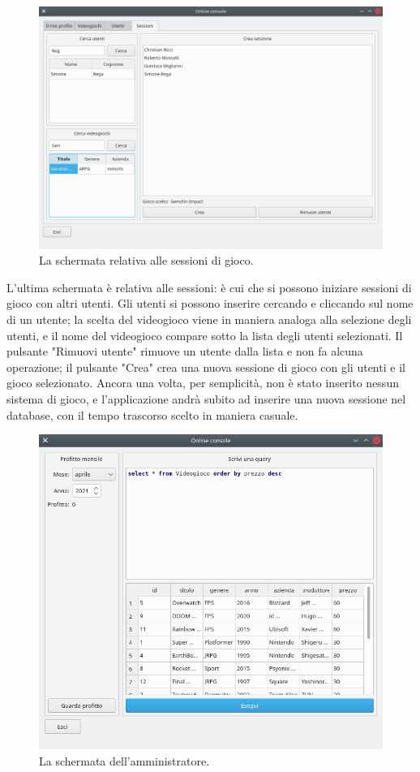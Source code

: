 \documentclass[a4paper,12pt]{report}
\begin{document}
\begin{figure}[H]
\centering{}
\includegraphics[width=12cm]{screen_sessions.png}
\caption{La schermata relativa alle sessioni di gioco.}
\label{img:screen_login}
\end{figure}

L'ultima schermata è relativa alle sessioni: è cui che si possono iniziare sessioni di gioco con altri utenti. Gli utenti si possono inserire cercando e cliccando sul nome di un utente; la scelta del videogioco viene in maniera analoga alla selezione degli utenti, e il nome del videogioco compare sotto la lista degli utenti selezionati. Il pulsante "Rimuovi utente" rimuove un utente dalla lista e non fa alcuna operazione; il pulsante "Crea" crea una nuova sessione di gioco con gli utenti e il gioco selezionato. Ancora una volta, per semplicità, non è stato inserito nessun sistema di gioco, e l'applicazione andrà subito ad inserire una nuova sessione nel database, con il tempo trascorso scelto in maniera casuale.

\begin{figure}[H]
\centering{}
\includegraphics[width=12cm]{screen_admin.png}
\caption{La schermata dell'amministratore.}
\label{img:screen_login}
\end{figure}
\end{document}
